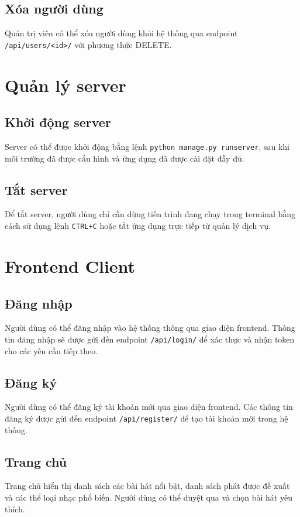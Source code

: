 \subsection{Xóa người dùng}
Quản trị viên có thể xóa người dùng khỏi hệ thống qua endpoint \texttt{/api/users/<id>/} với phương thức DELETE.

\section{Quản lý server}
\subsection{Khởi động server}
Server có thể được khởi động bằng lệnh \texttt{python manage.py runserver}, sau khi môi trường đã được cấu hình và ứng dụng đã được cài đặt đầy đủ.

\subsection{Tắt server}
Để tắt server, người dùng chỉ cần dừng tiến trình đang chạy trong terminal bằng cách sử dụng lệnh \texttt{CTRL+C} hoặc tắt ứng dụng trực tiếp từ quản lý dịch vụ.

\section{Frontend Client}
\subsection{Đăng nhập}
Người dùng có thể đăng nhập vào hệ thống thông qua giao diện frontend. Thông tin đăng nhập sẽ được gửi đến endpoint \texttt{/api/login/} để xác thực và nhận token cho các yêu cầu tiếp theo.

\subsection{Đăng ký}
Người dùng có thể đăng ký tài khoản mới qua giao diện frontend. Các thông tin đăng ký được gửi đến endpoint \texttt{/api/register/} để tạo tài khoản mới trong hệ thống.

\subsection{Trang chủ}
Trang chủ hiển thị danh sách các bài hát nổi bật, danh sách phát được đề xuất và các thể loại nhạc phổ biến. Người dùng có thể duyệt qua và chọn bài hát yêu thích.

